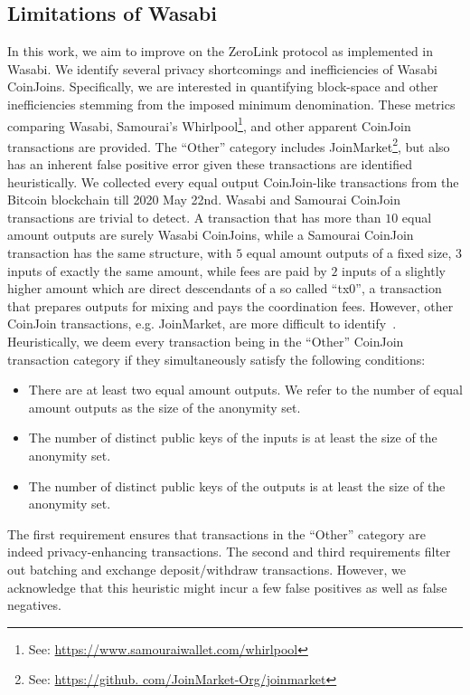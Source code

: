 \documentclass[a4paper]{article}
\begin{document}
\subsection{Limitations of Wasabi}\label{sec:limitations}
In this work, we aim to improve on the ZeroLink protocol as implemented in Wasabi. We identify several privacy shortcomings and inefficiencies of Wasabi CoinJoins. Specifically, we are interested in quantifying block-space and other inefficiencies stemming from the imposed minimum denomination. These metrics comparing Wasabi, Samourai's Whirlpool\footnote{See: \url{https://www.samouraiwallet.com/whirlpool}}, and other apparent CoinJoin transactions are provided. The ``Other'' category includes JoinMarket\footnote{See: \url{https://github. com/JoinMarket-Org/joinmarket}}, but also has an inherent false positive error given these transactions are identified heuristically. We collected every equal output CoinJoin-like transactions from the Bitcoin blockchain till 2020 May 22nd. Wasabi and Samourai CoinJoin transactions are trivial to detect. A transaction that has more than $10$ equal amount outputs are surely Wasabi CoinJoins, while a Samourai CoinJoin transaction has the same structure, with $5$ equal amount outputs of a fixed size, $3$ inputs of exactly the same amount, while fees are paid by $2$ inputs of a slightly higher amount which are direct descendants of a so called ``tx0'', a transaction that prepares outputs for mixing and pays the coordination fees. However, other CoinJoin transactions, e.g. JoinMarket, are more difficult to identify~\cite{moeser2017anonymous}. Heuristically, we deem every transaction being in the ``Other'' CoinJoin transaction category if they simultaneously satisfy the following conditions:

\begin{itemize}
    \item There are at least two equal amount outputs. We refer to the number of equal amount outputs as the size of the anonymity set.
    \item The number of distinct public keys of the inputs is at least the size of the anonymity set.
    \item The number of distinct public keys of the outputs is at least the size of the anonymity set.
\end{itemize}

The first requirement ensures that transactions in the ``Other'' category are indeed privacy-enhancing transactions. The second and third requirements filter out batching and exchange deposit/withdraw transactions. However, we acknowledge that this heuristic might incur a few false positives as well as false negatives.
\end{document}
